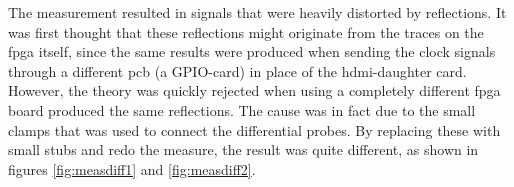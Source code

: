 \documentclass[main.tex]{subfiles}
\begin{document}
\begin{figure}[H] 
   \begin{center}
   \end{center}
\end{figure}

The measurement resulted in signals that were heavily distorted by reflections. It was first thought that these reflections might originate from the traces on the \gls{fpga} itself, since the same results were produced when sending the clock signals through a different \gls{pcb} (a GPIO-card) in place of the \gls{hdmi}-daughter card. However, the theory was quickly rejected when using a completely different \gls{fpga} board produced the same reflections. The cause was in fact due to the small clamps that was used to connect the differential probes. By replacing these with small stubs and redo the measure, the result was quite different, as shown in figures \ref{fig:measdiff1} and \ref{fig:measdiff2}.
\end{document}
